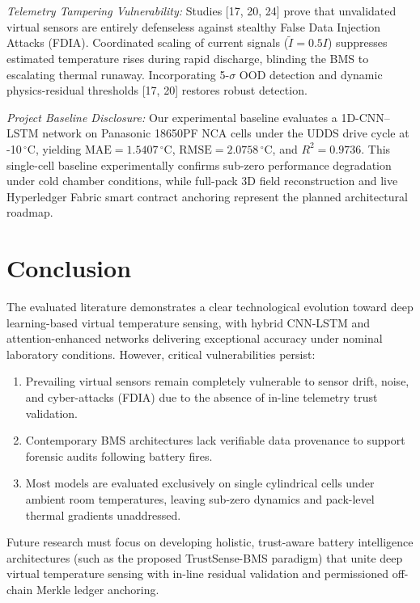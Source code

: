 \documentclass[conference]{IEEEtran}
\begin{document}
\textit{Telemetry Tampering Vulnerability:} Studies [17, 20, 24] prove that unvalidated virtual sensors are entirely defenseless against stealthy False Data Injection Attacks (FDIA). Coordinated scaling of current signals ($\tilde{I} = 0.5 I$) suppresses estimated temperature rises during rapid discharge, blinding the BMS to escalating thermal runaway. Incorporating 5-$\sigma$ OOD detection and dynamic physics-residual thresholds [17, 20] restores robust detection.

\textit{Project Baseline Disclosure:} Our experimental baseline evaluates a 1D-CNN--LSTM network on Panasonic 18650PF NCA cells under the UDDS drive cycle at -10\,$^\circ$C, yielding $\text{MAE} = 1.5407\,^\circ$C, $\text{RMSE} = 2.0758\,^\circ$C, and $R^2 = 0.9736$. This single-cell baseline experimentally confirms sub-zero performance degradation under cold chamber conditions, while full-pack 3D field reconstruction and live Hyperledger Fabric smart contract anchoring represent the planned architectural roadmap.

\section{Conclusion}
The evaluated literature demonstrates a clear technological evolution toward deep learning-based virtual temperature sensing, with hybrid CNN-LSTM and attention-enhanced networks delivering exceptional accuracy under nominal laboratory conditions. However, critical vulnerabilities persist:
\begin{enumerate}
    \item Prevailing virtual sensors remain completely vulnerable to sensor drift, noise, and cyber-attacks (FDIA) due to the absence of in-line telemetry trust validation.
    \item Contemporary BMS architectures lack verifiable data provenance to support forensic audits following battery fires.
    \item Most models are evaluated exclusively on single cylindrical cells under ambient room temperatures, leaving sub-zero dynamics and pack-level thermal gradients unaddressed.
\end{enumerate}

Future research must focus on developing holistic, trust-aware battery intelligence architectures (such as the proposed TrustSense-BMS paradigm) that unite deep virtual temperature sensing with in-line residual validation and permissioned off-chain Merkle ledger anchoring.
\end{document}

